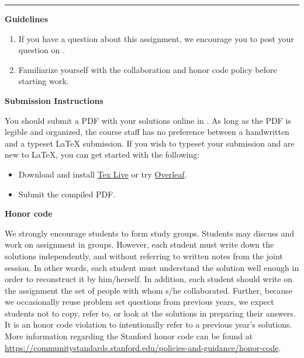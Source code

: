 \documentclass[11pt]{article}
\newcommand{\ruleskip}{\bigskip\hrule\bigskip}
\begin{document}
{\Huge\assignmenttitle}

\ruleskip


{\bf \due}

\vspace{0.2cm}
{\bf Guidelines}
\begin{enumerate}[itemsep=2pt]
    \item If you have a question about this assignment, we encourage you to post your question on \postquestion.
    \item Familiarize yourself with the collaboration and honor code policy before starting work.
\end{enumerate}

\vspace{0.2cm}

{\bf Submission Instructions} 
\vspace{0.2cm}

You should submit a PDF with your solutions online in \submissiononline. As long as the PDF is legible and
organized, the course staff has no preference between a handwritten and a typeset \LaTeX{} submission. If you wish
to typeset your submission and are new to \LaTeX{}, you can get started with the following:

\begin{itemize}
    \item Download and install \href{https://www.tug.org/texlive/}{Tex Live} or try \href{https://www.overleaf.com/}{Overleaf}.
    \item Submit the compiled PDF.
\end{itemize}

\vspace{0.2cm}

{\bf Honor code} 
\vspace{0.2cm}

We strongly encourage students to form study groups. Students may discuss and
work on assignment in groups. However, each student must write down the
solutions independently, and without referring to written notes from the joint
session. In other words, each student must understand the solution well enough
in order to reconstruct it by him/herself. In addition, each student should
write on the assignment the set of people with whom s/he collaborated. Further,
because we occasionally reuse problem set questions from previous years, we
expect students not to copy, refer to, or look at the solutions in preparing
their answers. It is an honor code violation to intentionally refer to a
previous year's solutions.  More information regarding the Stanford honor code
can be found at \href{https://communitystandards.stanford.edu/policies-and-guidance/honor-code}{https://communitystandards.stanford.edu/policies-and-guidance/honor-code}.
\end{document}
